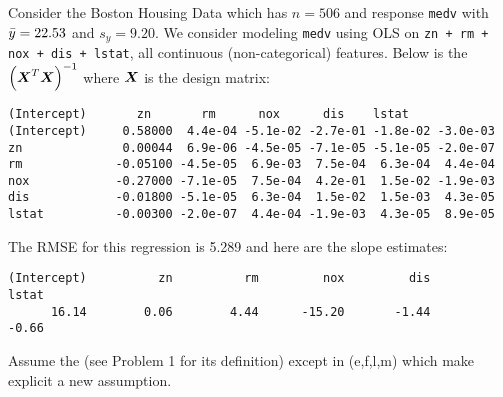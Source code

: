 \documentclass[12pt]{article}
\begin{document}
\problem Consider the Boston Housing Data which has $n = 506$ and response \texttt{medv} with $\bar{y} = 22.53$ and $s_y = 9.20$. We consider modeling \texttt{medv} using OLS on \texttt{zn + rm + nox + dis + lstat}, all continuous (non-categorical) features. Below is the $\left(\boldsymbol{X}^T\boldsymbol{X}\right)^{-1}$ where $\boldsymbol{X}$ is the design matrix:

\begin{Verbatim}[frame=single, fontsize = \small]
            (Intercept)       zn       rm      nox      dis    lstat
(Intercept)     0.58000  4.4e-04 -5.1e-02 -2.7e-01 -1.8e-02 -3.0e-03
zn              0.00044  6.9e-06 -4.5e-05 -7.1e-05 -5.1e-05 -2.0e-07
rm             -0.05100 -4.5e-05  6.9e-03  7.5e-04  6.3e-04  4.4e-04
nox            -0.27000 -7.1e-05  7.5e-04  4.2e-01  1.5e-02 -1.9e-03
dis            -0.01800 -5.1e-05  6.3e-04  1.5e-02  1.5e-03  4.3e-05
lstat          -0.00300 -2.0e-07  4.4e-04 -1.9e-03  4.3e-05  8.9e-05
\end{Verbatim}

\noindent The RMSE for this regression is 5.289 and here are the slope estimates:


\begin{Verbatim}[frame=single, fontsize = \small]
(Intercept)          zn          rm         nox         dis       lstat 
      16.14        0.06        4.44      -15.20       -1.44       -0.66
\end{Verbatim}

\noindent Assume the  (see Problem 1 for its definition) except in (e,f,l,m) which make explicit a new assumption.
\end{document}

